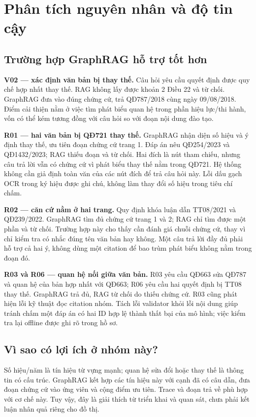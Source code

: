 \section{Phân tích nguyên nhân và độ tin cậy}
\subsection{Trường hợp GraphRAG hỗ trợ tốt hơn}
\textbf{V02 --- xác định văn bản bị thay thế.} Câu hỏi yêu cầu quyết định được quy chế hợp nhất thay thế. RAG không lấy được khoản 2 Điều 22 và từ chối. GraphRAG đưa vào đúng chứng cứ, trả QĐ787/2018 cùng ngày 09/08/2018. Điểm cải thiện nằm ở việc tìm phát biểu quan hệ trong phần hiệu lực/thi hành, vốn có thể kém tương đồng với câu hỏi so với đoạn nội dung đào tạo.

\textbf{R01 --- hai văn bản bị QĐ721 thay thế.} GraphRAG nhận diện số hiệu và ý định thay thế, ưu tiên đoạn chứng cứ trang 1. Đáp án nêu QĐ254/2023 và QĐ1432/2023; RAG thiếu đoạn và từ chối. Hai đích là nút tham chiếu, nhưng câu trả lời vẫn có chứng cứ vì phát biểu thay thế nằm trong QĐ721. Hệ thống không cần giả định toàn văn của các nút đích để trả câu hỏi này. Lỗi dấu gạch OCR trong ký hiệu được ghi chú, không làm thay đổi số hiệu trong tiêu chí chấm.

\textbf{R02 --- căn cứ nằm ở hai trang.} Quy định khóa luận dẫn TT08/2021 và QĐ239/2022. GraphRAG tìm đủ chứng cứ trang 1 và 2; RAG chỉ tìm được một phần và từ chối. Trường hợp này cho thấy cần đánh giá chuỗi chứng cứ, thay vì chỉ kiểm tra có nhắc đúng tên văn bản hay không. Một câu trả lời đầy đủ phải hỗ trợ cả hai ý, không dùng một citation để bao trùm phát biểu không nằm trong đoạn đó.

\textbf{R03 và R06 --- quan hệ nối giữa văn bản.} R03 yêu cầu QĐ663 sửa QĐ787 \cite{qd663} và quan hệ của bản hợp nhất với QĐ663; R06 yêu cầu hai quyết định bị TT08 thay thế. GraphRAG trả đủ, RAG từ chối do thiếu chứng cứ. R03 cũng phát hiện lỗi kỹ thuật đọc citation nhóm. Tách lỗi validator khỏi lỗi nội dung giúp tránh chấm một đáp án có hai ID hợp lệ thành thất bại của mô hình; việc kiểm tra lại offline được ghi rõ trong hồ sơ.

\subsection{Vì sao có lợi ích ở nhóm này?}
Số hiệu/năm là tín hiệu từ vựng mạnh; quan hệ sửa đổi hoặc thay thế là thông tin có cấu trúc. GraphRAG kết hợp các tín hiệu này với cạnh đã có câu dẫn, đưa đoạn chứng cứ vào ứng viên và cộng điểm ưu tiên. Trace và đoạn trả về phù hợp với cơ chế này. Tuy vậy, đây là giải thích từ triển khai và quan sát, chưa phải kết luận nhân quả riêng cho đồ thị.

